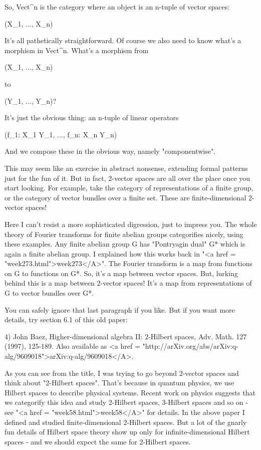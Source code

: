 So, Vect^{n} is the category where an object is an n-tuple of 
vector spaces:

(X_{1}, ..., X_{n})

It's all pathetically straightforward.  Of course we also need
to know what's a morphism in Vect^{n}.  What's a morphism from 

(X_{1}, ..., X_{n})

to

(Y_{1}, ..., Y_{n})?

It's just the obvious thing: an n-tuple of linear operators

(f_{1}: X_{1} \to  Y_{1}, ..., f_{n}: X_{n} \to  Y_{n})

And we compose these in the obvious way, namely "componentwise".

This may seem like an exercise in abstract nonsense, extending formal 
patterns just for the fun of it.  But in fact, 2-vector spaces are
all over the place once you start looking.  For example, take
the category of representations of a finite group, or the category
of vector bundles over a finite set.  These are finite-dimensional
2-vector spaces!  

Here I can't resist a more sophisticated digression, just to impress
you.  The whole theory of Fourier transforms for finite abelian groups 
categorifies nicely, using these examples.  Any finite abelian group 
G has "Pontryagin dual" G* which is again a finite abelian group.   
I explained how this works back in "<a href = "week273.html">week273</A>".  The Fourier transform 
is a map from functions on G to functions on G*.  So, it's a map 
between vector spaces.  But, lurking behind this is a map between 
2-vector spaces!  It's a map from representations of G to vector 
bundles over G*.

You can safely ignore that last paragraph if you like.  But if you 
want more details, try section 6.1 of this old paper:

4) John Baez, Higher-dimensional algebra II: 2-Hilbert spaces,
Adv. Math. 127 (1997), 125-189.  Also available as 
<a href = "http://arXiv.org/abs/arXiv:q-alg/9609018">arXiv:q-alg/9609018</A>.

As you can see from the title, I was trying to go beyond 2-vector
spaces and think about "2-Hilbert spaces".  That's because
in quantum physics, we use Hilbert spaces to describe physical
systems.  Recent work on physics suggests that we categorify this idea
and study 2-Hilbert spaces, 3-Hilbert spaces and so on - see "<a
href = "week58.html">week58</A>" for details.  In the above paper
I defined and studied finite-dimensional 2-Hilbert spaces.  But a lot
of the gnarly fun details of Hilbert space theory show up only for
infinite-dimensional Hilbert spaces - and we should expect the same
for 2-Hilbert spaces.

